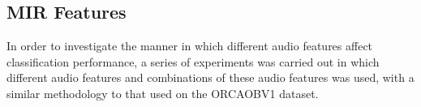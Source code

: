\documentclass[12pt,oneside]{book}
\begin{document}
%
%
\subsection{MIR Features}

In order to investigate the manner in which different audio features
affect classification performance, a series of experiments was carried
out in which different audio features and combinations of these audio
features was used, with a similar methodology to that used on the
ORCAOBV1 dataset.


\end{document}
